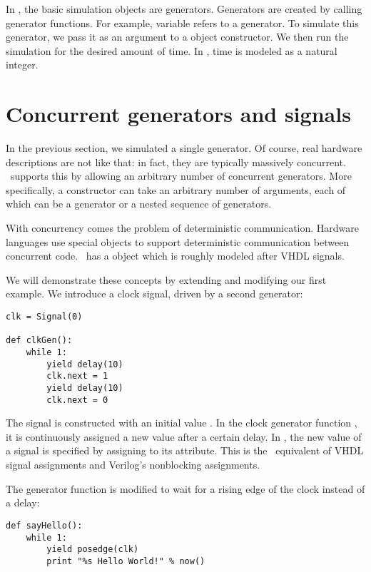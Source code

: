 In \myhdl{}, the basic simulation objects are generators. Generators
are created by calling generator functions. For example, variable
 refers to a generator. To simulate this generator, we pass
it as an argument to a  object constructor.  We then
run the simulation for the desired amount of time. In \myhdl{}, time
is modeled as a natural integer.


\section{Concurrent generators and signals}

In the previous section, we simulated a single generator. Of course,
real hardware descriptions are not like that: in fact, they are
typically massively concurrent. \myhdl\ supports this by allowing an
arbitrary number of concurrent generators. More specifically, a
 constructor can take an arbitrary number of
arguments, each of which can be a generator or a nested sequence of
generators.

With concurrency comes the problem of deterministic
communication. Hardware languages use special objects to
support deterministic communication between concurrent code. \myhdl\
has a  object which is roughly modeled after VHDL
signals.

We will demonstrate these concepts by extending and modifying our
first example. We introduce a clock signal, driven by a second
generator: 

\begin{verbatim}
clk = Signal(0)

def clkGen():
    while 1:
        yield delay(10)
        clk.next = 1
        yield delay(10)
        clk.next = 0

\end{verbatim}

The  signal is constructed with an initial value
. In the clock generator function , it is
continuously assigned a new value after a certain delay. In \myhdl{},
the new value of a signal is specified by assigning to its
 attribute. This is the \myhdl\ equivalent of VHDL signal
assignments and Verilog's nonblocking assignments.

The  generator function is modified to wait for a
rising edge of the clock instead of a delay:

\begin{verbatim}
def sayHello():
    while 1:
        yield posedge(clk)
        print "%s Hello World!" % now()

\end{verbatim}

